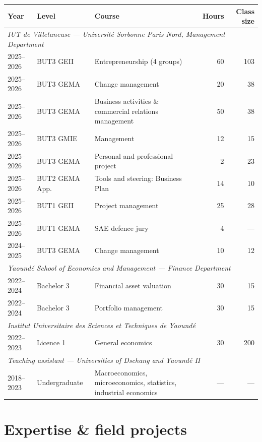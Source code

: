 \documentclass[
  french,
  10pt,
  letterpaper,
  DIV=11,
  numbers=noendperiod]{scrartcl}
\begin{document}
\begin{center}
\footnotesize
\renewcommand{\arraystretch}{1.25}
\begin{tabularx}{\textwidth}{@{}l l X r r@{}}
\toprule
\textbf{Year} & \textbf{Level} & \textbf{Course} & \textbf{Hours} & \textbf{Class size} \\
\midrule
\multicolumn{5}{l}{\textit{IUT de Villetaneuse — Université Sorbonne Paris Nord, Management Department}} \\
\midrule
2025–2026 & BUT3 GEII & Entrepreneurship (4 groups) & 60 & 103 \\
2025–2026 & BUT3 GEMA & Change management & 20 & 38 \\
2025–2026 & BUT3 GEMA & Business activities \& commercial relations management & 50 & 38 \\
2025–2026 & BUT3 GMIE & Management & 12 & 15 \\
2025–2026 & BUT3 GEMA & Personal and professional project & 2 & 23 \\
2025–2026 & BUT2 GEMA App. & Tools and steering: Business Plan & 14 & 10 \\
2025–2026 & BUT1 GEII & Project management & 25 & 28 \\
2025–2026 & BUT1 GEMA & SAE defence jury & 4 & — \\
2024–2025 & BUT3 GEMA & Change management & 10 & 12 \\
\midrule
\multicolumn{5}{l}{\textit{Yaoundé School of Economics and Management — Finance Department}} \\
\midrule
2022–2024 & Bachelor 3 & Financial asset valuation & 30 & 15 \\
2022–2024 & Bachelor 3 & Portfolio management & 30 & 15 \\
\midrule
\multicolumn{5}{l}{\textit{Institut Universitaire des Sciences et Techniques de Yaoundé}} \\
\midrule
2022–2023 & Licence 1 & General economics & 30 & 200 \\
\midrule
\multicolumn{5}{l}{\textit{Teaching assistant — Universities of Dschang and Yaoundé II}} \\
\midrule
2018–2023 & Undergraduate & Macroeconomics, microeconomics, statistics, industrial economics & — & — \\
\bottomrule
\end{tabularx}
\end{center}

\section{Expertise \& field projects}\label{expertise-field-projects}
\end{document}
